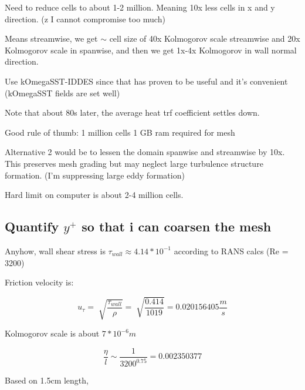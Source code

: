 \documentclass[12pt]{article}
\renewcommand{\_}{\kern-1.5pt\textunderscore\kern-1.5pt}
\begin{document}
Need to reduce cells to about 1-2 million. Meaning 10x less cells in x and y direction. (z I cannot compromise too much)\par

Means streamwise, we get $ \sim $  cell size of 40x Kolmogorov scale streamwise and 20x Kolmogorov scale in spanwise, and then we get 1x-4x Kolmogorov in wall normal direction.\par

Use kOmegaSST-IDDES since that has proven to be useful and it’s convenient (kOmegaSST fields are set well)\par

Note that about 80s later, the average heat trf coefficient settles down.\par

Good rule of thumb: 1 million cells  1 GB ram required for mesh\par


\vspace{\baselineskip}
Alternative 2 would be to lessen the domain spanwise and streamwise by 10x. This preserves mesh grading but may neglect large turbulence structure formation. (I’m suppressing large eddy formation)\par

Hard limit on computer is about 2-4 million cells.\par


\vspace{\baselineskip}

\subsection{Quantify ${y}^{+}$ so that i can coarsen the mesh}
Anyhow, wall shear stress is  \(  \tau_{wall} \approx 4.14\ast10^{-1} \)  according to RANS calcs (Re = 3200)\par

Friction velocity is:\par

 \[ u_{ \tau}=\sqrt[]{\frac{ \tau_{wall}}{ \rho }}=\sqrt[]{\frac{0.414}{1019}}=0.020156405\frac{m}{s} \] \par

Kolmogorov scale is about  \( 7\ast10^{-6}m \) \par

 \[ \frac{ \eta }{l} \sim \frac{1}{3200^{0.75}}=0.002350377 \] \par

Based on 1.5cm length,\par
\end{document}
